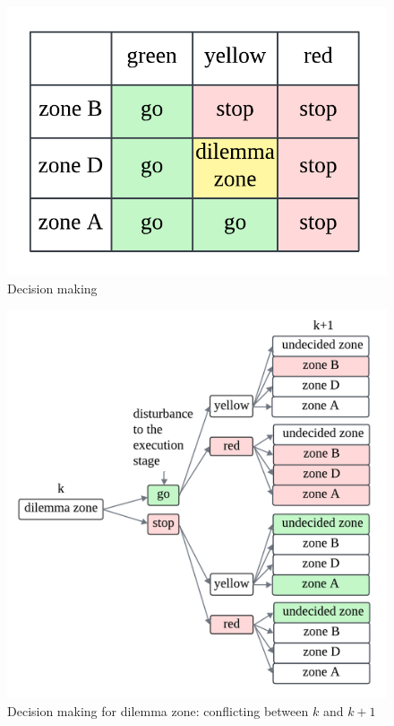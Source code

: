 \begin{figure}[!htbp]
    \centering
    \includegraphics[width= 0.45\linewidth]{figures/decision making.png}
    \caption{Decision making}
    \label{fig: Decision making}
\end{figure}
\begin{figure}[!htbp]
    \centering
    \includegraphics[width= 0.65\linewidth]{figures/decision making for dilemma zone.png}
    \caption{Decision making for dilemma zone: conflicting between $k$ and $k+1$}
    \label{fig: Decision making for dilemma zone}
\end{figure}




